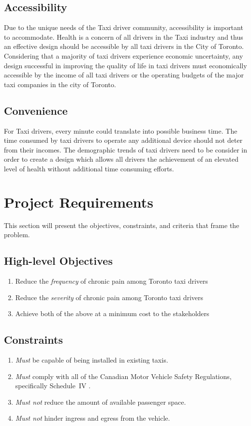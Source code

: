 \documentclass[11pt]{article}
\begin{document}
\subsection{Accessibility}
Due to the unique needs of the Taxi driver community, accessibility is 
important to accommodate. Health is a concern of all drivers in the Taxi 
industry and thus an effective design should be accessible by all taxi 
drivers in the City of Toronto. Considering that a majority of taxi 
drivers experience economic uncertainty\cite{facey2003health}, any design 
successful in improving the quality of life in taxi drivers must 
economically accessible by the income of all taxi drivers or the operating 
budgets of the major taxi companies in the city of Toronto. 
 
\subsection{Convenience}
For Taxi drivers, every minute could translate into possible business 
time\cite{ facey2003health}. The time consumed by taxi drivers to operate 
any additional device should not deter from their incomes. The demographic 
trends of taxi drivers need to be consider in order to create a design 
which allows all drivers the achievement of an elevated level of health 
without additional time consuming efforts.

\section{Project Requirements}
\label{sec:requirements}
This section will present the objectives, constraints, and criteria 
that frame the problem.

\subsection{High-level Objectives}
\label{sec:high-level-objectives}

\begin{enumerate}
\item Reduce the \emph{frequency} of chronic pain among Toronto taxi drivers
\item Reduce the \emph{severity} of chronic pain among Toronto taxi drivers
\item Achieve both of the above at a minimum cost to the stakeholders
\end{enumerate}

\subsection{Constraints}
\begin{enumerate}
\item \emph{Must} be capable of being installed in existing taxis.
\item \emph{Must} comply with all of the Canadian Motor Vehicle Safety Regulations,
specifically Schedule~IV \cite{motorregs}.
\item \emph{Must not} reduce the amount of available passenger space.
\item \emph{Must not} hinder ingress and egress from the vehicle.
\end{enumerate}
\end{document}

